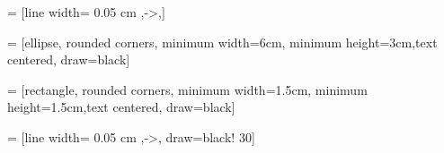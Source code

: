  = [line width= 0.05 cm ,->,]



 = [ellipse, rounded corners, minimum width=6cm, minimum height=3cm,text centered, draw=black]

 = [rectangle, rounded corners, minimum width=1.5cm, minimum height=1.5cm,text centered, draw=black]

 = [line width= 0.05 cm ,->, draw=black! 30]



\renewcommand*{\checkmark}{\ding{51}}



\renewcommand{\lsImpressumExtra}{This book is the revised version of the author's PhD dissertation Heinrich-Heine-Universität Düsseldorf, 2018 (D61)}


\renewcommand{\textlengthmark}{ː}
